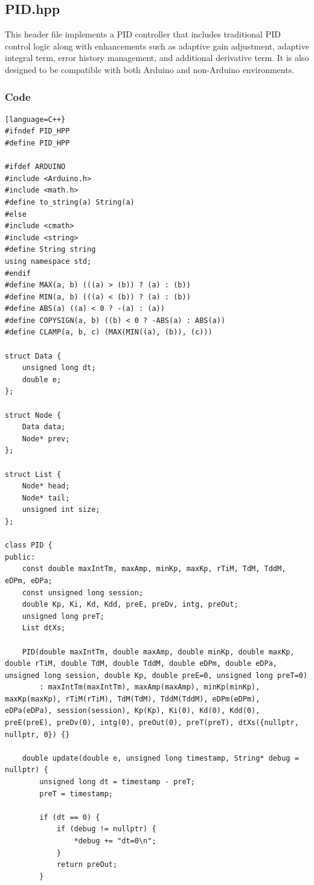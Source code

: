 \documentclass[a4paper,12pt]{article}
\begin{document}
\subsection{PID.hpp}
This header file implements a PID controller that includes traditional PID control logic along with enhancements such as adaptive gain adjustment, adaptive integral term, error history management, and additional derivative term. It is also designed to be compatible with both Arduino and non-Arduino environments.
\subsubsection{Code}
\begin{lstlisting}[language=C++}
#ifndef PID_HPP
#define PID_HPP

#ifdef ARDUINO
#include <Arduino.h>
#include <math.h>
#define to_string(a) String(a)
#else
#include <cmath>
#include <string>
#define String string
using namespace std;
#endif
#define MAX(a, b) (((a) > (b)) ? (a) : (b))
#define MIN(a, b) (((a) < (b)) ? (a) : (b))
#define ABS(a) ((a) < 0 ? -(a) : (a))
#define COPYSIGN(a, b) ((b) < 0 ? -ABS(a) : ABS(a))
#define CLAMP(a, b, c) (MAX(MIN((a), (b)), (c)))

struct Data {
    unsigned long dt;
    double e;
};

struct Node {
    Data data;
    Node* prev;
};

struct List {
    Node* head;
    Node* tail;
    unsigned int size;
};

class PID {
public:
    const double maxIntTm, maxAmp, minKp, maxKp, rTiM, TdM, TddM, eDPm, eDPa;
    const unsigned long session;
    double Kp, Ki, Kd, Kdd, preE, preDv, intg, preOut;
    unsigned long preT;
    List dtXs;

    PID(double maxIntTm, double maxAmp, double minKp, double maxKp, double rTiM, double TdM, double TddM, double eDPm, double eDPa, unsigned long session, double Kp, double preE=0, unsigned long preT=0)
        : maxIntTm(maxIntTm), maxAmp(maxAmp), minKp(minKp), maxKp(maxKp), rTiM(rTiM), TdM(TdM), TddM(TddM), eDPm(eDPm), eDPa(eDPa), session(session), Kp(Kp), Ki(0), Kd(0), Kdd(0), preE(preE), preDv(0), intg(0), preOut(0), preT(preT), dtXs({nullptr, nullptr, 0}) {}

    double update(double e, unsigned long timestamp, String* debug = nullptr) {
        unsigned long dt = timestamp - preT;
        preT = timestamp;

        if (dt == 0) {
            if (debug != nullptr) {
                *debug += "dt=0\n";
            }
            return preOut;
        }


\end{lstlisting}
\end{document}
